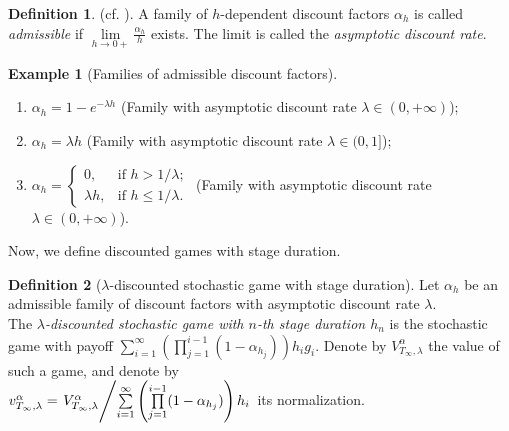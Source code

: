 \documentclass[english,openary,12pt]{article}
\theoremstyle{definition}
\newtheorem{example}{Example}
\newtheorem{definition}{Definition}
\begin{document}
\begin{definition}(cf. \cite[p. 240]{Ney13}).
A family of $h$-dependent discount factors $\alpha_h$ is called 
\emph{admissible} if 
$\displaystyle{\lim\limits_{h \to 0+} \frac{\alpha_h}{h}}$ exists. 
The limit is called the \emph{asymptotic discount rate}.
\end{definition}

\begin{example}[Families of admissible discount factors] \
\begin{enumerate}
\item $\alpha_h = 1 - e^{- \lambda h}$ (Family with asymptotic discount 
rate $\lambda \in (0,+\infty)$);
\item $\alpha_h = \lambda h$ (Family with asymptotic discount 
rate $\lambda \in (0,1]$);
\item $\alpha_h = 
\begin{cases}
0, &\text{if } h > 1/\lambda; \\
\lambda h, &\text{if } h \le 1/\lambda.
\end{cases}$ (Family with asymptotic discount rate $\lambda \in (0,+\infty)$).
\end{enumerate}
\end{example}

Now, we define discounted games with stage duration.

\begin{definition}[$\lambda$-discounted stochastic game with stage duration]
	Let $\alpha_h$ be an admissible family of discount factors with 
	asymptotic discount rate $\lambda$. \\
  The \emph{$\lambda$-discounted stochastic game with $n$-th stage duration $h_n$} 
	is the stochastic game with payoff
	$\sum\limits_{i = 1}^\infty \left(\prod\limits_{j = 1}^{i-1} 
	(1-\alpha_{h_j}) \right) h_i g_i.$
	Denote by $V^\alpha_{T_\infty,\lambda}$ the value of such a game, and denote by\\
	$v^\alpha_{T_\infty,\lambda} = \left.V^\alpha_{T_\infty,\lambda} \middle/
	\sum\limits_{i = 1}^\infty \left(\prod\limits_{j = 1}^{i-1} 
	(1-\alpha_{h_j}) \right) h_i\right.$ 
	its normalization.
\end{definition}

\end{document}
